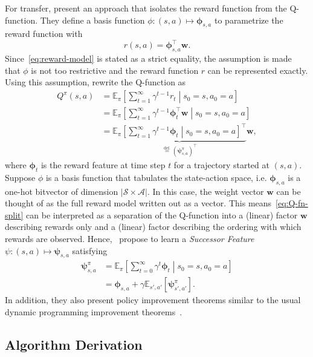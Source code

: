 \documentclass{article}
\begin{document}
For transfer, \citeauthor{barreto2016successor} present an approach that isolates the reward function from the Q-function.
They define a basis function $\phi : (s,a) \mapsto \pmb{\phi}_{s,a}$ to parametrize the reward function with
\begin{equation}
r(s,a) = \pmb{\phi}_{s,a}^\top \pmb{w}. \label{eq:reward-model}
\end{equation}
Since~\eqref{eq:reward-model} is stated as a strict equality, the assumption is made that $\phi$ is not too restrictive and the reward function $r$ can be represented exactly.
Using this assumption, \citeauthor{barreto2016successor} rewrite the Q-function as
\begin{align}
Q^\pi(s,a) &= \mathbb{E}_\pi \left[ \sum_{t=1}^\infty \gamma^{t-1} r_t  \middle| s_0=s, a_0=a \right] \nonumber \\
&= \mathbb{E}_\pi \left[ \sum_{t=1}^\infty \gamma^{t-1}  \pmb{\phi}_t^\top \pmb{w}  \middle| s_0=s, a_0=a \right] \nonumber \\
&= \underbrace{\mathbb{E}_\pi \left[ \sum_{t=1}^\infty \gamma^{t-1} \pmb{\phi}_t \middle| s_0=s, a_0=a \right]^\top}_{\overset{\text{def.}}{=} (\pmb{\psi}^\pi_{s,a})^\top} \pmb{w}, \label{eq:Q-fn-split}
\end{align}
where $\pmb{\phi}_t$ is the reward feature at time step $t$ for a trajectory started at $(s,a)$. 
Suppose $\phi$ is a basis function that tabulates the state-action space, i.e. $\pmb{\phi}_{s,a}$ is a one-hot bitvector of dimension $| \mathcal{S} \times \mathcal{A} |$.
In this case, the weight vector $\pmb{w}$ can be thought of as the full reward model written out as a vector.
This means~\eqref{eq:Q-fn-split} can be interpreted as a separation of the Q-function into a (linear) factor $\pmb{w}$ describing rewards only and a (linear) factor describing the ordering with which rewards are observed.
Hence,~\citeauthor{barreto2016successor} propose to learn a \emph{Successor Feature} $\psi : (s,a) \mapsto \pmb{\psi}_{s,a}$ satisfying 
\begin{align}
\pmb{\psi}^\pi_{s,a} &= \mathbb{E}_\pi \left[ \sum_{t=0}^\infty \gamma^t \pmb{\phi}_t \middle| s_0=s, a_0=a \right]\nonumber \\
&= \pmb{\phi}_{s,a} + \gamma \mathbb{E}_{s',a'} \left[ \pmb{\psi}^\pi_{s',a'} \right].  \label{eq:SF-def}
\end{align}
In addition, they also present policy improvement theorems similar to the usual dynamic programming improvement theorems~\cite{Sutton98}.

\subsection{Algorithm Derivation}
\end{document}
